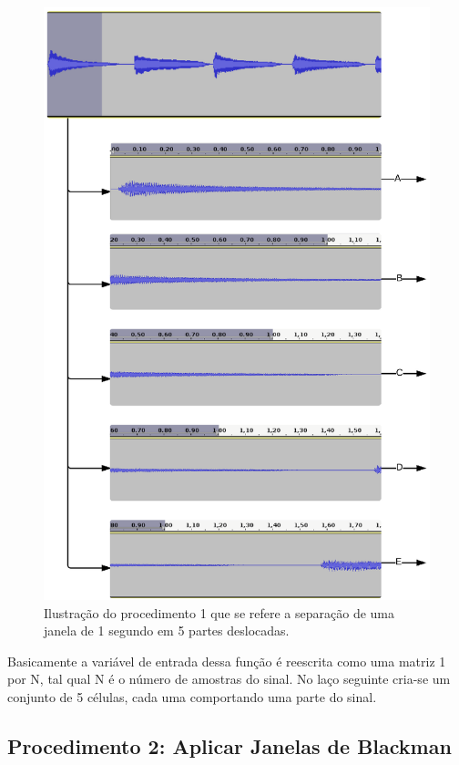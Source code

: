 \begin{figure}[h] 
  \centering
    \includegraphics[keepaspectratio=true, scale=0.7]{figuras/procedimento_1}
    \caption{Ilustração do procedimento 1 que se refere a separação de uma janela de 1 segundo em 5 partes deslocadas.}
    \label{fig:procedimento_1}
\end{figure}


Basicamente a variável de entrada dessa função é reescrita como uma matriz 1 por N, tal qual N é o número de amostras do sinal. No laço seguinte cria-se um conjunto de 5 células, cada uma comportando uma parte do sinal.

\subsection{Procedimento 2: Aplicar Janelas de Blackman}
\label{subsec:procedimento_2}

